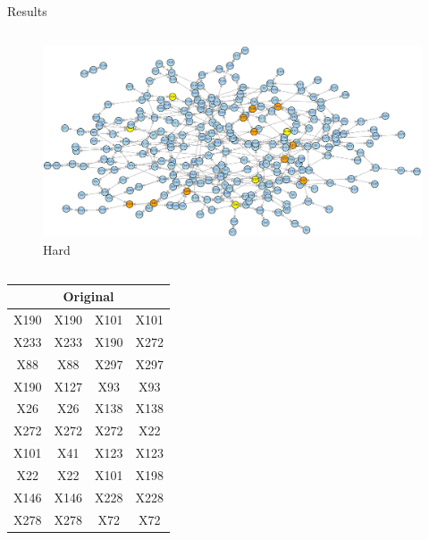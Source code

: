 \documentclass[final]{beamer} %
\newcommand{\boz}{\cellcolor{pathwaynode}}
\newcommand{\ghool}{\cellcolor{independentnode}}
\begin{document}
\begin{frame}{}
\begin{block}{Results}
\begin{columns}
        \begin{column}{0.25\textwidth}
          \begin{figure}
            \includegraphics[width=\textwidth]{synthesized-hard}
            \caption{\tiny Hard}
          \end{figure}
          \begin{columns}
            \begin{column}{0.5\textwidth}
              \center
              \tiny
              \begin{tabular}{| c c || c c |}
                \hline
                \toprule
                \multicolumn{4}{c}{Original} \\ 
                \midrule \hline
                \boz X190   &  \boz X190  &
                X101   &  X101  \\ \hline
                X233   &  X233  &
                \boz X190   &  \boz X272  \\ \hline
                \ghool X88   &  \ghool X88  &
                X297   &  X297  \\ \hline
                \boz X190   &  X127  &
                X93   &  X93  \\ \hline
                X26   &  X26  &
                \boz X138   &  \boz X138  \\ \hline
                \boz X272   &  \boz X272 &
                \boz X272   &  \boz X22  \\ \hline
                X101   &  X41  &
                X123   &  X123  \\ \hline
                \boz X22   &  \boz X22 &
                X101   &  X198  \\ \hline
                X146   &  X146  &
                \boz X228   &  \boz X228  \\ \hline
                X278   &  X278  &
                X72   &  X72  \\ \hline

\end{tabular}
\end{column}
\end{columns}
\end{column}
\end{columns}
\end{block}
\end{frame}
\end{document}
